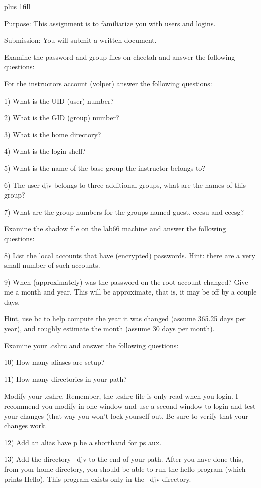 
\rightskip=0pt plus 1fill

\parindent 0pt

Purpose: This assignment is to familiarize you with users and logins.

Submission: You will submit a written document.

Examine the password and group files on {\ltt{}cheetah}
and answer the following questions:

For the instructors account ({\ltt{}volper}) answer the following
questions:

1) What is the UID (user) number?

2) What is the GID (group) number?

3) What is the home directory?

4) What is the login shell?

5) What is the name of the base group the instructor belongs to?

6) The user {\ltt{}djv} belongs to three additional groups,
what are the names of this group?

7) What are the group numbers for the groups named {\ltt{}guest},
{\ltt{}cecsu} and {\ltt{}cecsg}?

Examine the shadow file on the {\ltt{}lab66} machine
and answer the following questions:

8) List the local accounts that have (encrypted) passwords.
Hint: there are a very small number of such accounts.

9) When (approximately) was the password on the root account changed?
Give me a month and year. This will be approximate, that is, it
may be off by a couple days.

Hint, use bc to help compute the year it was changed (assume
365.25 days per year), and roughly estimate the month 
(assume 30 days per month).

Examine your {\ltt{}.cshrc} and answer the following questions:

10) How many aliases are setup?

11) How many directories in your path?

Modify your {\ltt{}.cshrc}.
Remember, the {\ltt{}.cshrc} file is only read when you login.
I recommend you modify in one window and use a second window
to login and test your changes (that way you won't lock yourself out.
Be sure to verify that your changes work.

12) Add an alias have {\ltt{}p} be a shorthand for {\ltt{}ps aux}.

13) Add the directory {\ltt{}~djv} to the end of your path.
After you have done this, from your home directory, you should be
able to run the {\ltt{}hello} program (which prints {\ltt{}Hello}).
This program exists only in the {\ltt{}~djv} directory.

\bye
